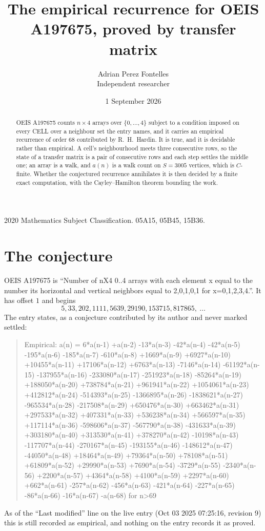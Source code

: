 \documentclass[11pt,a4paper]{article}
\title{The empirical recurrence for OEIS A197675, proved by transfer matrix}
\author{Adrian Perez Fontelles\\ \small Independent researcher}
\date{1 September 2026}
\theoremstyle{plain}
\theoremstyle{definition}
\begin{document}
\maketitle

\begin{abstract}
OEIS A197675 counts $n\times4$ arrays over $\{0,\dots,4\}$ subject to a condition imposed on
every CELL over a neighbour set the entry names, and it carries an empirical recurrence of
order $68$ contributed by R.~H.~Hardin. It is true, and it is decidable rather than
empirical. A cell's neighbourhood meets three consecutive rows, so the state of a transfer
matrix is a pair of consecutive rows and each step settles the middle one; an array is a
walk, and $a(n)$ is a walk count on $S=3005$ vertices, which is $C$-finite. Whether the
conjectured recurrence annihilates it is then decided by a finite exact computation, with the
Cayley--Hamilton theorem bounding the work.
\end{abstract}

\noindent\small 2020 Mathematics Subject Classification. 05A15, 05B45, 15B36.\normalsize

\section{The conjecture}

OEIS A197675 is ``Number of nX4 0..4 arrays with each element x equal to the number its horizontal and vertical neighbors equal to 2,0,1,0,1 for x=0,1,2,3,4.''. It has offset $1$ and begins
\[
5, 33, 202, 1111, 5639, 29190, 153715, 817865,\ \dots
\]
The entry states, as a conjecture contributed by its author and never marked settled:
\begin{quote}
Empirical: a(n) = 6*a(n-1) +a(n-2) -13*a(n-3) -42*a(n-4) -42*a(n-5) -195*a(n-6) -185*a(n-7) -610*a(n-8) +1669*a(n-9) +6927*a(n-10) +10455*a(n-11) +17106*a(n-12) +6763*a(n-13) -7146*a(n-14) -61192*a(n-15) -137955*a(n-16) -233080*a(n-17) -251923*a(n-18) -85264*a(n-19) +188050*a(n-20) +738784*a(n-21) +961941*a(n-22) +1054061*a(n-23) +412812*a(n-24) -514393*a(n-25) -1366895*a(n-26) -1838621*a(n-27) -965534*a(n-28) -217508*a(n-29) +650476*a(n-30) +663462*a(n-31) +297533*a(n-32) +407331*a(n-33) +536238*a(n-34) +566597*a(n-35) +117114*a(n-36) -598606*a(n-37) -567790*a(n-38) -431633*a(n-39) +303180*a(n-40) +313530*a(n-41) +378270*a(n-42) -10198*a(n-43) -117707*a(n-44) -270167*a(n-45) -193155*a(n-46) -148612*a(n-47) -44050*a(n-48) +18464*a(n-49) +79364*a(n-50) +78108*a(n-51) +61809*a(n-52) +29990*a(n-53) +7690*a(n-54) -3729*a(n-55) -2340*a(n-56) +2200*a(n-57) +4364*a(n-58) +4100*a(n-59) +2297*a(n-60) +662*a(n-61) -257*a(n-62) -456*a(n-63) -421*a(n-64) -227*a(n-65) -86*a(n-66) -16*a(n-67) -a(n-68) for n>69
\end{quote}
As of the ``Last modified'' line on the live entry (Oct 03 2025 07:25:16, revision 9) this is still
recorded as empirical, and nothing on the entry records it as proved.
\end{document}
